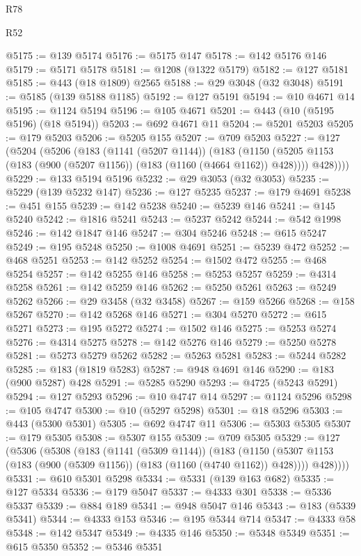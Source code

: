 \begin{lexlean}{R78}
\begin{lexlean}{R52}
\begin{coremodule}
{{{{{{{{{{{{{{{{{{{{{{{{{{{{{{{{{{{{{{{{{{{{{{{{{{{{{{{{{{{{{{{{{{{{{{{{{{{{{{{{{{{{{{{{{{{{{{{{{{{{{{{{{{{{{{{{{{{{{{{{{{{{{{{{{{{{{{{{{{{{{{{{{{{{{{{{{{{{{{{{{{{{{{{{{{{{{{{{{{{{{{{{{{{{{{{{{{{{{{@5175 := @139 @5174
@5176 := @5175 @147
@5178 := @142 @5176 @146
@5179 := @5171 @5178
@5181 := @1208 (@1322 @5179)
@5182 := @127 @5181
@5185 := @443 (@18 @1809) @2565
@5188 := @29 @3048 (@32 @3048)
@5191 := @5185 (@139 @5188 @1185)
@5192 := @127 @5191
@5194 := @10 @4671 @14
@5195 := @1124 @5194
@5196 := @105 @4671
@5201 := @443 (@10 (@5195 @5196) (@18 @5194))
@5203 := @692 @4671 @11
@5204 := @5201 @5203
@5205 := @179 @5203
@5206 := @5205 @155
@5207 := @709 @5203
@5227 := @127
    (@5204
      (@5206
        (@183
          (@1141 (@5207 @1144))
          (@183
            (@1150 (@5205 @1153 (@183 (@900 (@5207 @1156)) (@183 (@1160 (@4664 @1162)) @428))))
            @428))))
@5229 := @133 @5194 @5196
@5232 := @29 @3053 (@32 @3053)
@5235 := @5229 (@139 @5232 @147)
@5236 := @127 @5235
@5237 := @179 @4691
@5238 := @451 @155
@5239 := @142 @5238
@5240 := @5239 @146
@5241 := @145 @5240
@5242 := @1816 @5241
@5243 := @5237 @5242
@5244 := @542 @1998
@5246 := @142 @1847 @146
@5247 := @304 @5246
@5248 := @615 @5247
@5249 := @195 @5248
@5250 := @1008 @4691
@5251 := @5239 @472
@5252 := @468 @5251
@5253 := @142 @5252
@5254 := @1502 @472
@5255 := @468 @5254
@5257 := @142 @5255 @146
@5258 := @5253 @5257
@5259 := @4314 @5258
@5261 := @142 @5259 @146
@5262 := @5250 @5261
@5263 := @5249 @5262
@5266 := @29 @3458 (@32 @3458)
@5267 := @159 @5266
@5268 := @158 @5267
@5270 := @142 @5268 @146
@5271 := @304 @5270
@5272 := @615 @5271
@5273 := @195 @5272
@5274 := @1502 @146
@5275 := @5253 @5274
@5276 := @4314 @5275
@5278 := @142 @5276 @146
@5279 := @5250 @5278
@5281 := @5273 @5279 @5262
@5282 := @5263 @5281
@5283 := @5244 @5282
@5285 := @183 (@1819 @5283)
@5287 := @948 @4691 @146
@5290 := @183 (@900 @5287) @428
@5291 := @5285 @5290
@5293 := @4725 (@5243 @5291)
@5294 := @127 @5293
@5296 := @10 @4747 @14
@5297 := @1124 @5296
@5298 := @105 @4747
@5300 := @10 (@5297 @5298)
@5301 := @18 @5296
@5303 := @443 (@5300 @5301)
@5305 := @692 @4747 @11
@5306 := @5303 @5305
@5307 := @179 @5305
@5308 := @5307 @155
@5309 := @709 @5305
@5329 := @127
    (@5306
      (@5308
        (@183
          (@1141 (@5309 @1144))
          (@183
            (@1150 (@5307 @1153 (@183 (@900 (@5309 @1156)) (@183 (@1160 (@4740 @1162)) @428))))
            @428))))
@5331 := @610 @5301 @5298
@5334 := @5331 (@139 @163 @682)
@5335 := @127 @5334
@5336 := @179 @5047
@5337 := @4333 @301
@5338 := @5336 @5337
@5339 := @884 @189
@5341 := @948 @5047 @146
@5343 := @183 (@5339 @5341)
@5344 := @4333 @153
@5346 := @195 @5344 @714
@5347 := @4333 @58
@5348 := @142 @5347
@5349 := @4335 @146
@5350 := @5348 @5349
@5351 := @615 @5350
@5352 := @5346 @5351
}}}}}}}}}}}}}}}}}}}}}}}}}}}}}}}}}}}}}}}}}}}}}}}}}}}}}}}}}}}}}}}}}}}}}}}}}}}}}}}}}}}}}}}}}}}}}}}}}}}}}}}}}}}}}}}}}}}}}}}}}}}}}}}}}}}}}}}}}}}}}}}}}}}}}}}}}}}}}}}}}}}}}}}}}}}}}}}}}}}}}}}}}}}}}}}}}}}}}}
\end{coremodule}
\end{lexlean}
\end{lexlean}
